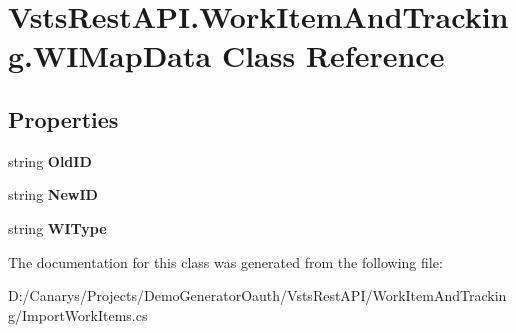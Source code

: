 \hypertarget{class_vsts_rest_a_p_i_1_1_work_item_and_tracking_1_1_w_i_map_data}{}\section{Vsts\+Rest\+A\+P\+I.\+Work\+Item\+And\+Tracking.\+W\+I\+Map\+Data Class Reference}
\label{class_vsts_rest_a_p_i_1_1_work_item_and_tracking_1_1_w_i_map_data}
\subsection*{Properties}
\begin{DoxyCompactItemize}
\item 
\mbox{\label{class_vsts_rest_a_p_i_1_1_work_item_and_tracking_1_1_w_i_map_data_a1cb9e281fa7c55a2c729ca94c2294672}} 
string {\bfseries Old\+ID}
\item 
\mbox{\label{class_vsts_rest_a_p_i_1_1_work_item_and_tracking_1_1_w_i_map_data_adb9bfede4dd6bceae8bf9beb0d568910}} 
string {\bfseries New\+ID}
\item 
\mbox{\label{class_vsts_rest_a_p_i_1_1_work_item_and_tracking_1_1_w_i_map_data_a5b2161c2d51a4f9e18492397d52dff3a}} 
string {\bfseries W\+I\+Type}
\end{DoxyCompactItemize}


The documentation for this class was generated from the following file\+:\begin{DoxyCompactItemize}
\item 
D\+:/\+Canarys/\+Projects/\+Demo\+Generator\+Oauth/\+Vsts\+Rest\+A\+P\+I/\+Work\+Item\+And\+Tracking/Import\+Work\+Items.\+cs\end{DoxyCompactItemize}
